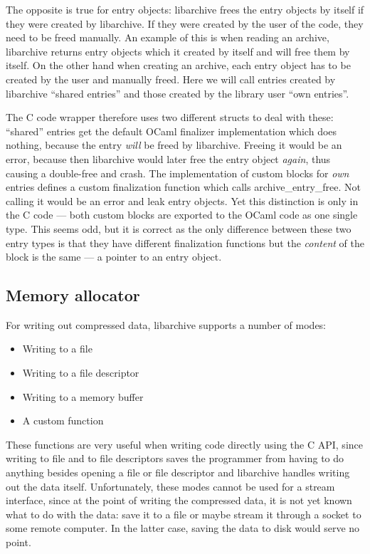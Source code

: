 \documentclass[parskip=half]{scrreprt}
\newcommand\inline[1]{{\addfontfeature{Letters=SmallCaps}#1}}
\begin{document}
The opposite is true for entry objects: libarchive frees the entry objects by
itself if they were created by libarchive. If they were created by the user of
the code, they need to be freed manually. An example of this is when reading an
archive, libarchive returns entry objects which it created by itself and will
free them by itself. On the other hand when creating an archive, each entry
object has to be created by the user and manually freed. Here we will call
entries created by libarchive \enquote{shared entries} and those created by the
library user \enquote{own entries}.

The C code wrapper therefore uses two different structs to deal with these:
\enquote{shared} entries get the default OCaml finalizer implementation which
does nothing, because the entry \emph{will} be freed by libarchive. Freeing it
would be an error, because then libarchive would later free the entry object
\emph{again}, thus causing a double-free and crash. The implementation of
custom blocks for \emph{own} entries defines a custom finalization function
which calls \inline{archive\_entry\_free}. Not calling it would be an error and
leak entry objects. Yet this distinction is only in the C code — both custom
blocks are exported to the OCaml code as one single type. This seems odd, but
it is correct as the only difference between these two entry types is that they
have different finalization functions but the \emph{content} of the block is
the same — a pointer to an entry object.

\subsection{Memory allocator}
\label{sec:allocator}

For writing out compressed data, libarchive supports a number of modes:

\begin{itemize}
  \item Writing to a file
  \item Writing to a file descriptor
  \item Writing to a memory buffer
  \item A custom function
\end{itemize}

These functions are very useful when writing code directly using the C API,
since writing to file and to file descriptors saves the programmer from having
to do anything besides opening a file or file descriptor and libarchive handles
writing out the data itself. Unfortunately, these modes cannot be used for a
stream interface, since at the point of writing the compressed data, it is not
yet known what to do with the data: save it to a file or maybe stream it
through a socket to some remote computer. In the latter case, saving the data
to disk would serve no point.
\end{document}
